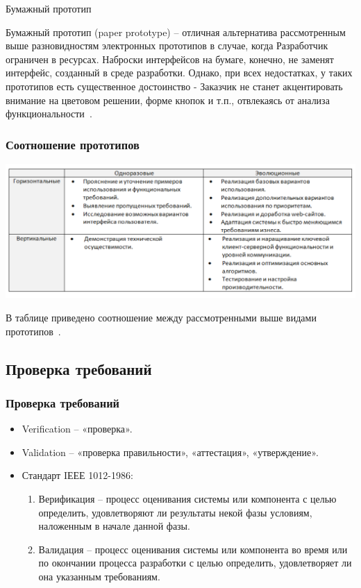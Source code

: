 \documentclass{../industrial-development}
\begin{document}
{\alert{Бумажный прототип}

Бумажный прототип (paper prototype) – отличная альтернатива рассмотренным
выше разновидностям электронных прототипов в случае, когда Разработчик ограничен в
ресурсах. Наброски интерфейсов на бумаге, конечно, не заменят интерфейс, созданный в
среде разработки. Однако, при всех недостатках, у таких прототипов есть существенное достоинство - Заказчик не станет акцентировать внимание на цветовом решении, форме кнопок
и т.п., отвлекаясь от анализа функциональности~\cite[с.~54--55]{Maglinec}.

\begin{frame} \frametitle {Соотношение прототипов}
 \centerline{\includegraphics[width=1.2\textwidth]{pict8.pdf}}
\end{frame}

\lecturenotes

В таблице приведено соотношение между рассмотренными выше видами
прототипов~\cite[с.~55]{Maglinec}.


\subsection{Проверка требований}
\begin{frame} \frametitle {Проверка требований}
\begin{itemize}
\item \alert{Verification} -- «проверка».
\item \alert{Validation} -- «проверка правильности», «аттестация»,
«утверждение».
\item Стандарт IЕЕЕ 1012-1986:
\begin{enumerate}
\item \alert{Верификация} -- процесс оценивания системы или
компонента с целью определить, удовлетворяют ли
результаты некой фазы условиям, наложенным в
начале данной фазы.
\item \alert{Валидация} -- процесс оценивания системы или
компонента во время или по окончании процесса
разработки с целью определить, удовлетворяет ли
она указанным требованиям.
\end{enumerate}
\end{itemize}


\end{frame}}
\end{document}
